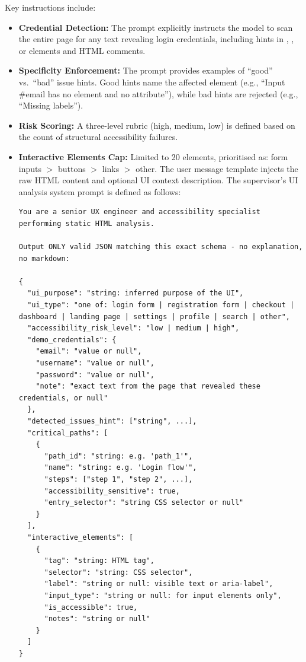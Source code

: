 Key instructions include:
\begin{itemize}
    \item \textbf{Credential Detection:} The prompt explicitly instructs the model to scan the entire page for any text revealing login credentials, including hints in , , or  elements and HTML comments.
    \item \textbf{Specificity Enforcement:} The prompt provides examples of ``good'' vs.\ ``bad'' issue hints. Good hints name the affected element (e.g., ``Input \#email has no  element and no  attribute''), while bad hints are rejected (e.g., ``Missing labels'').
    \item \textbf{Risk Scoring:} A three-level rubric (high, medium, low) is defined based on the count of structural accessibility failures.
    \item \textbf{Interactive Elements Cap:} Limited to 20 elements, prioritised as: form inputs $>$ buttons $>$ links $>$ other.
The user message template injects the raw HTML content and optional UI context description. The supervisor's UI analysis system prompt is defined as follows:

\begin{lstlisting}[caption={Supervisor UI Analysis system prompt excerpt (from \filepath{prompts/supervisor\_prompts.py}).}, label={lst:ui-analysis-prompt}]
You are a senior UX engineer and accessibility specialist performing static HTML analysis.

Output ONLY valid JSON matching this exact schema - no explanation, no markdown:

{
  "ui_purpose": "string: inferred purpose of the UI",
  "ui_type": "one of: login form | registration form | checkout | dashboard | landing page | settings | profile | search | other",
  "accessibility_risk_level": "low | medium | high",
  "demo_credentials": {
    "email": "value or null",
    "username": "value or null",
    "password": "value or null",
    "note": "exact text from the page that revealed these credentials, or null"
  },
  "detected_issues_hint": ["string", ...],
  "critical_paths": [
    {
      "path_id": "string: e.g. 'path_1'",
      "name": "string: e.g. 'Login flow'",
      "steps": ["step 1", "step 2", ...],
      "accessibility_sensitive": true,
      "entry_selector": "string CSS selector or null"
    }
  ],
  "interactive_elements": [
    {
      "tag": "string: HTML tag",
      "selector": "string: CSS selector",
      "label": "string or null: visible text or aria-label",
      "input_type": "string or null: for input elements only",
      "is_accessible": true,
      "notes": "string or null"
    }
  ]
}
\end{lstlisting}


\end{itemize}
